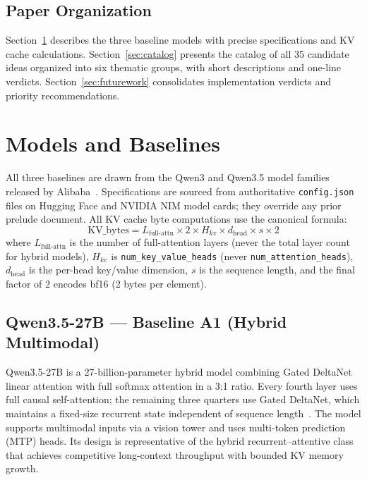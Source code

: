 \documentclass[11pt]{article}
\begin{document}
\subsection*{Paper Organization}

Section~\ref{sec:baselines} describes the three baseline models with precise specifications and KV cache calculations.
Section~\ref{sec:catalog} presents the catalog of all 35 candidate ideas organized into six thematic groups, with short descriptions and one-line verdicts.
Section~\ref{sec:futurework} consolidates implementation verdicts and priority recommendations.

\section{Models and Baselines}
\label{sec:baselines}

All three baselines are drawn from the Qwen3 and Qwen3.5 model families released by Alibaba~\cite{Qwen2025,Qwen35_2025}.
Specifications are sourced from authoritative \texttt{config.json} files on Hugging Face and NVIDIA NIM model cards; they override any prior prelude document.
All KV cache byte computations use the canonical formula:
\begin{equation}
\text{KV\_bytes} = L_{\text{full-attn}} \times 2 \times H_{kv} \times d_{\text{head}} \times s \times 2
\label{eq:kv_formula}
\end{equation}
where $L_{\text{full-attn}}$ is the number of full-attention layers (never the total layer count for hybrid models), $H_{kv}$ is \texttt{num\_key\_value\_heads} (never \texttt{num\_attention\_heads}), $d_{\text{head}}$ is the per-head key/value dimension, $s$ is the sequence length, and the final factor of 2 encodes bf16 (2 bytes per element).

\subsection{Qwen3.5-27B --- Baseline A1 (Hybrid Multimodal)}
\label{sec:baseline_a1}

Qwen3.5-27B is a 27-billion-parameter hybrid model combining Gated DeltaNet linear attention with full softmax attention in a 3:1 ratio.
Every fourth layer uses full causal self-attention; the remaining three quarters use Gated DeltaNet, which maintains a fixed-size recurrent state independent of sequence length~\cite{Yang2024DeltaNet}.
The model supports multimodal inputs via a vision tower and uses multi-token prediction (MTP) heads.
Its design is representative of the hybrid recurrent--attentive class that achieves competitive long-context throughput with bounded KV memory growth.
\end{document}
